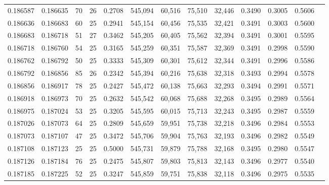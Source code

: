 \begin{tabular}{rrrrrrrrrrrrr}
0.186587 & 0.186635 &    70 &  26 &                                     0.2708 & 545,094 &  60,516 &  75,510 &  32,446 & 0.3490 & 0.3005 & 0.5606 \\
0.186636 & 0.186683 &    60 &  25 &                                     0.2941 & 545,154 &  60,456 &  75,535 &  32,421 & 0.3491 & 0.3003 & 0.5600 \\
0.186683 & 0.186718 &    51 &  27 &                                     0.3462 & 545,205 &  60,405 &  75,562 &  32,394 & 0.3491 & 0.3001 & 0.5595 \\
0.186718 & 0.186760 &    54 &  25 &                                     0.3165 & 545,259 &  60,351 &  75,587 &  32,369 & 0.3491 & 0.2998 & 0.5590 \\
0.186762 & 0.186792 &    50 &  25 &                                     0.3333 & 545,309 &  60,301 &  75,612 &  32,344 & 0.3491 & 0.2996 & 0.5586 \\
0.186792 & 0.186856 &    85 &  26 &                                     0.2342 & 545,394 &  60,216 &  75,638 &  32,318 & 0.3493 & 0.2994 & 0.5578 \\
0.186856 & 0.186917 &    78 &  25 &                                     0.2427 & 545,472 &  60,138 &  75,663 &  32,293 & 0.3494 & 0.2991 & 0.5571 \\
0.186918 & 0.186973 &    70 &  25 &                                     0.2632 & 545,542 &  60,068 &  75,688 &  32,268 & 0.3495 & 0.2989 & 0.5564 \\
0.186975 & 0.187024 &    53 &  25 &                                     0.3205 & 545,595 &  60,015 &  75,713 &  32,243 & 0.3495 & 0.2987 & 0.5559 \\
0.187026 & 0.187073 &    64 &  25 &                                     0.2809 & 545,659 &  59,951 &  75,738 &  32,218 & 0.3496 & 0.2984 & 0.5553 \\
0.187073 & 0.187107 &    47 &  25 &                                     0.3472 & 545,706 &  59,904 &  75,763 &  32,193 & 0.3496 & 0.2982 & 0.5549 \\
0.187108 & 0.187123 &    25 &  25 &                                     0.5000 & 545,731 &  59,879 &  75,788 &  32,168 & 0.3495 & 0.2980 & 0.5547 \\
0.187126 & 0.187184 &    76 &  25 &                                     0.2475 & 545,807 &  59,803 &  75,813 &  32,143 & 0.3496 & 0.2977 & 0.5540 \\
0.187185 & 0.187225 &    52 &  25 &                                     0.3247 & 545,859 &  59,751 &  75,838 &  32,118 & 0.3496 & 0.2975 & 0.5535 \\

\end{tabular}

